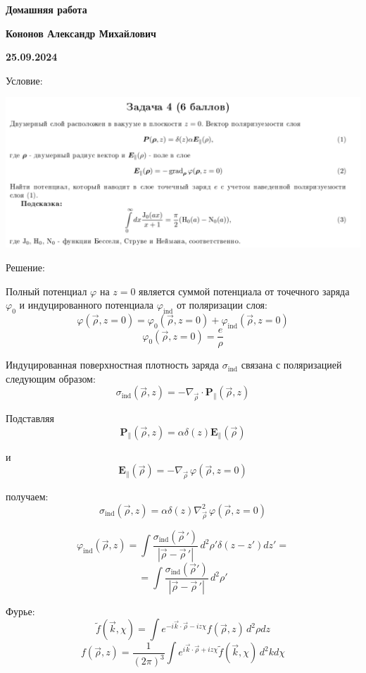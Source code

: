 \documentclass[12pt]{article}
\begin{document}
\begin{large}
\begin{center}
\LARGE \textbf{Домашняя работа}
\par
\LARGE \textbf{Кононов Александр Михайлович}
\par
    \textbf{25.09.2024}
\end{center}
\par Условие:
\par
\includegraphics[width=1\textwidth]{photo.png}
\par Решение:
\par Полный потенциал $\varphi$ на $ z = 0 $ является суммой потенциала от точечного заряда $\varphi_0$ и индуцированного потенциала $\varphi_{\text{ind}}$ от поляризации слоя:
\[
    \varphi(\vec{\rho}, z = 0) = \varphi_0(\vec{\rho}, z = 0) + \varphi_{\text{ind}}(\vec{\rho}, z = 0)
\]
\[
    \varphi_0(\vec{\rho}, z = 0) = \frac{e}{\rho}
\]
\par Индуцированная поверхностная плотность заряда $ \sigma_{\text{ind}} $ связана с поляризацией следующим образом:
\[
    \sigma_{\text{ind}}(\vec{\rho}, z) = -\nabla_{\vec{\rho}} \cdot \mathbf{P}_{\parallel}(\vec{\rho}, z)
\]
\par Подставляя
\[
    \mathbf{P}_{\parallel}(\vec{\rho}, z) = \alpha \delta(z) \mathbf{E}_{\parallel}(\vec{\rho})
\]
\par и
\[
    \mathbf{E}_{\parallel}(\vec{\rho}) = -\nabla_{\vec{\rho}} \, \varphi(\vec{\rho}, z = 0)
\]
\par получаем:
\[
    \sigma_{\text{ind}}(\vec{\rho}, z) = \alpha \delta(z) \nabla_{\vec{\rho}}^2 \, \varphi(\vec{\rho}, z = 0)
\]
\par
\[
    \varphi_{\text{ind}}(\vec{\rho}, z) = \int \frac{\sigma_{\text{ind}}(\vec{\rho}\,')}{|\vec{\rho} - \vec{\rho}\,'|} \, d^2 \rho' \delta(z - z') dz' =
\]
\[
    = \int \frac{\sigma_{\text{ind}}(\vec{\rho}')}{|\vec{\rho} - \vec{\rho}\,'|} \, d^2 \rho'
\]
\par Фурье:
\[
    \tilde{f}(\vec{k}, \chi) = \int e^{-i \vec{k} \cdot \vec{\rho} - i z \chi} f(\vec{\rho}, z) \, d^2 \rho dz
\]
\[
    f(\vec{\rho}, z) = \frac{1}{(2\pi)^3} \int e^{i \vec{k} \cdot \vec{\rho} + i z \chi} \tilde{f}(\vec{k}, \chi) \, d^2 k d \chi
\]


\end{large}
\end{document}
